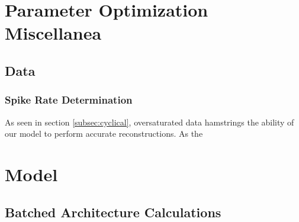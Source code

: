 \begin{appendices}
	\chapter{Parameter Optimization Miscellanea}
	\section{Data}
	\subsection{Spike Rate Determination}
	As seen in section \ref{subsec:cyclical}, oversaturated data hamstrings the 
	ability of our model to perform accurate reconstructions. As the 

	\chapter{Model}
	\section{Batched Architecture Calculations}


\end{appendices}
